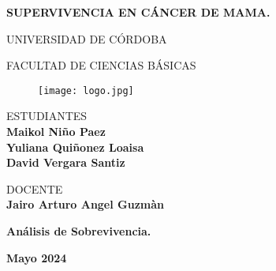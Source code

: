 \documentclass[10pt,a4paper]{article}
\begin{document}
\begin{center}

\vspace{1.7cm}    
    \Large
    \textbf{ SUPERVIVENCIA EN CÁNCER DE MAMA. }
  
    \vspace{0.7cm}
    \LARGE
    UNIVERSIDAD DE CÓRDOBA 
    
    \vspace{0.8cm}
    \LARGE
    FACULTAD DE CIENCIAS BÁSICAS
  \vspace{1.5cm}  
  \begin{figure}[H]
\centering
  
  
  \texttt{[image: logo.jpg]}   
   
\end{figure}      
  
    
    
    
    \vspace{1.5cm}
    \normalsize    
     
    \vspace{.3cm}
    ESTUDIANTES \\
    \large
    \textbf{Maikol Niño Paez \\ Yuliana Quiñonez Loaisa \\David Vergara Santiz }
    
    \vspace{1.5cm}
    \normalsize    
    DOCENTE \\
    
    \large
    \textbf{Jairo Arturo Angel Guzmàn }
    
    \vspace{1cm}
    \normalsize    
  
    \vspace{.2cm}
    \large
    \textbf{Análisis de Sobrevivencia.}
    
    \vspace{0.7 cm}
    \textbf{Mayo 2024}
\end{center}

\date{} 

\justify
\setlength{\parindent}{0cm}



\tableofcontents
\newpage


\listoftables
\newpage

\listoffigures
\newpage

\newpage
\end{document}

